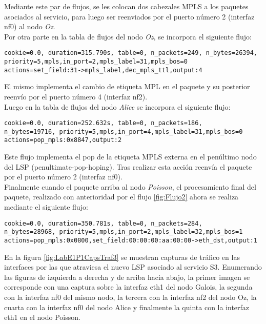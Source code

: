 Mediante este par de flujos, se les colocan dos cabezales MPLS a los paquetes asociados al servicio, para luego ser reenviados por el puerto n\'umero 2 (interfaz nf0) al nodo \textit{Oz}.\\

Por otra parte en la tabla de flujos del nodo \textit{Oz}, se incorpora el siguiente flujo:

\begin{center}
\texttt{cookie=0.0, duration=315.790s, table=0, n\_packets=249, n\_bytes=26394, \\
priority=5,mpls,in\_port=2,mpls\_label=31,mpls\_bos=0 \\
actions=set\_field:31->mpls\_label,dec\_mpls\_ttl,output:4 }
\end{center}

El mismo implementa el cambio de etiqueta MPL en el paquete y su posterior reenvío por el puerto n\'umero 4 (interfaz nf2).\\

Luego en la tabla de flujos del nodo \textit{Alice} se incorpora el siguiente flujo:

\begin{center}
\texttt{cookie=0.0, duration=252.632s, table=0, n\_packets=186, \\
n\_bytes=19716, priority=5,mpls,in\_port=4,mpls\_label=31,mpls\_bos=0 \\
actions=pop\_mpls:0x8847,output:2 }
\end{center}

Este flujo implementa el pop de la etiqueta MPLS externa en el penúltimo nodo del LSP (penultimate-pop-hoping). Tras realizar esta acci\'on reenvía el paquete por el puerto n\'umero 2 (interfaz nf0).\\

Finalmente cuando el paquete arriba al nodo \textit{Poisson}, el procesamiento final del paquete, realizado con anterioridad por el flujo \ref{fig:Flujo2} ahora se realiza mediante el siguiente flujo: 

\begin{center}
\texttt{cookie=0.0, duration=350.781s, table=0, n\_packets=284, \\
n\_bytes=28968, priority=5,mpls,in\_port=2,mpls\_label=32,mpls\_bos=1 \\
actions=pop\_mpls:0x0800,set\_field:00:00:00:aa:00:00->eth\_dst,output:1 }
\end{center}

En la figura \ref{fig:LabE1P1CapsTraf3} se muestran capturas de tr\'afico en las interfaces por las que atraviesa el nuevo LSP asociado al servicio S3. Enumerando las figuras de izquierda a derecha y de arriba hacia abajo, la primer imagen se corresponde con una captura sobre la interfaz eth1 del nodo Galois, la segunda con la interfaz nf0 del mismo nodo, la tercera con la interfaz nf2 del nodo Oz, la cuarta con la interfaz nf0 del nodo Alice y finalmente la quinta con la interfaz eth1 en el nodo Poisson.

